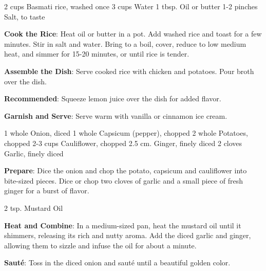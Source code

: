\documentclass{article}
\begin{document}
\begin{step}
2 cups Basmati rice, washed once
3 cups Water
1 tbsp. Oil or butter
1-2 pinches Salt, to taste

\method
\textbf{Cook the Rice}: Heat oil or butter in a pot. Add washed rice and toast for a few minutes. Stir in salt and water. Bring to a boil, cover, reduce to low medium heat, and simmer for 15-20 minutes, or until rice is tender.

\textbf{Assemble the Dish}: Serve cooked rice with chicken and potatoes. Pour broth over the dish.

\textbf{Recommended}: Squeeze lemon juice over the dish for added flavor.

\textbf{Garnish and Serve}: Serve warm with vanilla or cinnamon ice cream.
\end{step}





\dishType{\maindish}
\dishOther{\vegan}

\begin{step}
1 whole Onion, diced
1 whole Capsicum (pepper), chopped
2 whole Potatoes, chopped
2-3 cups Cauliflower, chopped
2.5 cm. Ginger, finely diced 
2 cloves Garlic, finely diced 

\method
\textbf{Prepare}: Dice the onion and chop the potato, capsicum and cauliflower into bite-sized pieces. Dice or chop two cloves of garlic and a small piece of fresh ginger for a burst of flavor.
\end{step}

\begin{step}
2 tsp. Mustard Oil

\method
\textbf{Heat and Combine}: In a medium-sized pan, heat the mustard oil until it shimmers, releasing its rich and nutty aroma. Add the diced garlic and ginger, allowing them to sizzle and infuse the oil for about a minute.

\textbf{Sauté}: Toss in the diced onion and sauté until a beautiful golden color.
\end{step}
\end{document}
